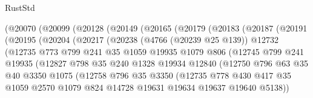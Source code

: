 \begin{lexlean}{RustStd}
\begin{coremodule}
        (@20070
          (@20099
            (@20128
              (@20149
                (@20165
                  (@20179
                    (@20183
                      (@20187
                        (@20191
                          (@20195
                            (@20204
                              (@20217
                                (@20238
                                  (@4766 (@20239 @25 @139))
                                  @12732
                                  (@12735
                                    @773
                                    @799
                                    @241
                                    @35
                                    @1059
                                    @19935
                                    @1079
                                    @806
                                    (@12745
                                      @799
                                      @241
                                      @19935
                                      (@12827
                                        @798
                                        @35
                                        @240
                                        @1328
                                        @19934
                                        @12840
                                        (@12750
                                          @796
                                          @63
                                          @35
                                          @40
                                          @3350
                                          @1075
                                          (@12758
                                            @796
                                            @35
                                            @3350
                                            (@12735
                                              @778
                                              @430
                                              @417
                                              @35
                                              @1059
                                              @2570
                                              @1079
                                              @824
                                              @14728
                                              @19631
                                              @19634
                                              @19637
                                              @19640
                                              @5138))

\end{coremodule}
\end{lexlean}
